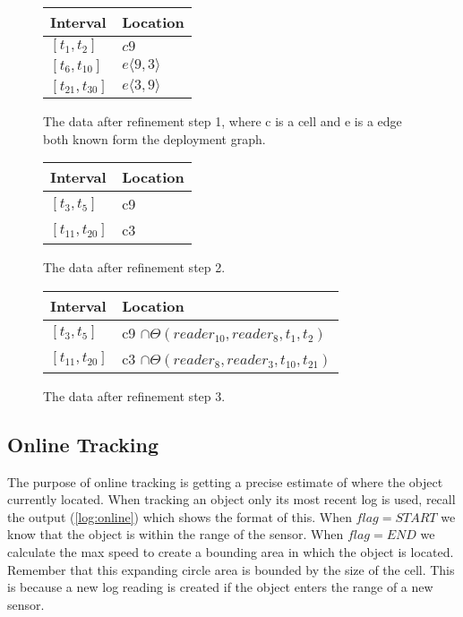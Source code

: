 \begin{figure}
\begin{minipage}[tbh]{\columnwidth}

  \vspace*{\fill}
  \centering
		\begin{tabular}{ l  l  }
		\toprule
		\textbf{Interval} & \textbf{Location}\\ 
		\midrule
		$[t_1,t_2]$ & $c9$ \\ 

		$[t_6,t_{10}]$ &  $e\langle9,3\rangle$\\ 

		$[t_{21},t_{30}]$ &  $ e\langle3,9\rangle $\\ 
		\bottomrule
		\end{tabular}
  \caption{The data after refinement step 1, where c is a cell and e is a edge both known form the deployment graph.}
  \label{fig:ref1} \par\vfill
	
	
		\begin{tabular}{  l  l  }
		\toprule
		\textbf{Interval} & \textbf{Location}\\ 
		\midrule
		$[t_3,t_5]$ & c9 \\ 

		$[t_{11},t_{20}]$ &  c3\\ 
		\bottomrule
		\end{tabular}
  \caption{The data after refinement step 2.}
  \label{fig:ref2}
	
		\begin{tabular}{  l  l  }
		\toprule
		\textbf{Interval} & \textbf{Location}\\ 
		\midrule
		$[t_3,t_5]$ & c9 $\cap \Theta(reader_10,reader_8,t_1,t_2)$ \\ 

		$[t_{11},t_{20}]$ &  c3 $\cap \Theta(reader_8,reader_3,t_{10},t_{21})$\\ 
		\hline
		\end{tabular}
			
	\caption{The data after refinement step 3. }
  \label{fig:ref3}

\end{minipage}
\end{figure}


\subsection{Online Tracking}
\label{sub:online}
The purpose of online tracking is getting a precise estimate of where the object currently located.
When tracking an object only its most recent log is used, recall the output (\ref{log:online}) which shows the format of this.
When $flag=START$ we know that the object is within the range of the sensor.
When $flag=END$ we calculate the max speed to create a bounding area in which the object is located. Remember that this expanding circle area is bounded by the size of the cell. 
This is because a new log reading is created if the object enters the range of a new sensor.

